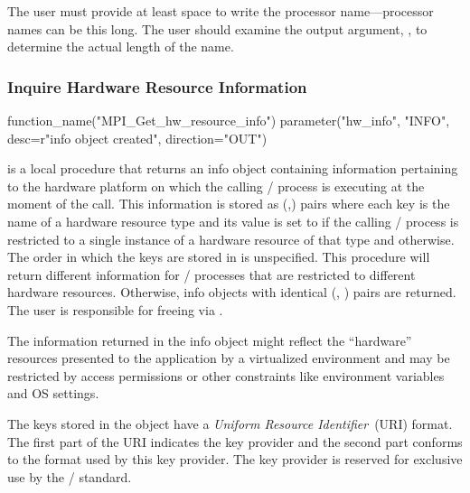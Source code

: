 \begin{users}
The user must provide at least  space
to write the processor name---processor names can be this long.  The user
should examine the 
output 
argument, , to determine
the actual length of the name.
\end{users}

\subsubsection{Inquire Hardware Resource Information}
\label{subsubsec:inquiry-hw-resource-info}
    
\begin{mpi-binding}
  function_name("MPI_Get_hw_resource_info")
  parameter("hw_info", "INFO", desc=r"info object created", direction="OUT")
\end{mpi-binding}

 is a local procedure that returns an info object containing
information pertaining to the hardware platform on which the calling \MPI/ process is executing at the
moment of the call. This information is stored as (,)  pairs where each key 
is the name of a hardware resource type and its value is set to  if the calling \MPI/ process
is restricted to a single instance of a hardware resource of that type and  otherwise.
The order in which the keys are stored in   is unspecified.
This procedure will return different information for \MPI/ processes that are restricted to
different hardware resources. Otherwise, info objects with identical (, ) pairs are returned.
The user is responsible for freeing  via .

\begin{users}
  The information returned in the info object might reflect the ``hardware'' resources presented to the application by
  a virtualized environment and may be restricted by access permissions or other constraints like environment
  variables and OS settings.
\end{users}

The keys stored in the  object have a \emph{Uniform Resource Identifier}~(URI) format.
The first part of the URI indicates the key provider and the second part conforms to the format used by
this key provider. The key provider  is reserved for exclusive use by the \MPI/ standard.

